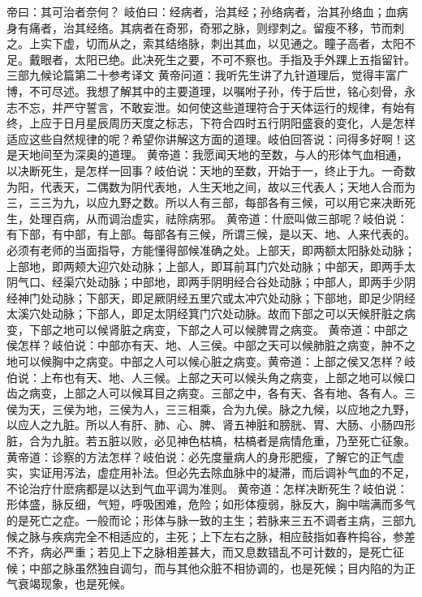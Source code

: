 \documentclass[a4paper,12pt,UTF8,twoside]{ctexbook}
\begin{document}
帝曰：其可治者奈何？
岐伯曰：经病者，治其经；孙络病者，治其孙络血；血病身有痛者，治其经络。其病者在奇邪，奇邪之脉，则缪刺之。留瘦不移，节而刺之。上实下虚，切而从之，索其结络脉，刺出其血，以见通之。瞳子高者，太阳不足。戴眼者，太阳已绝。此决死生之要，不可不察也。手指及手外踝上五指留针。
三部九候论篇第二十参考译文
黄帝问道：我听先生讲了九针道理后，觉得丰富广博，不可尽述。我想了解其中的主要道理，以嘱咐子孙，传于后世，铭心刻骨，永志不忘，并严守誓言，不敢妄泄。如何使这些道理符合于天体运行的规律，有始有终，上应于日月星辰周历天度之标志，下符合四时五行阴阳盛衰的变化，人是怎样适应这些自然规律的呢？希望你讲解这方面的道理。岐伯回答说：问得多好啊！这是天地间至为深奥的道理。
黄帝道：我愿闻天地的至数，与人的形体气血相通，以决断死生，是怎样一回事？岐伯说：天地的至数，开始于一，终止于九。一奇数为阳，代表天，二偶数为阴代表地，人生天地之间，故以三代表人；天地人合而为三，三三为九，以应九野之数。所以人有三部，每部各有三候，可以用它来决断死生，处理百病，从而调治虚实，祛除病邪。
黄帝道：什麽叫做三部呢？岐伯说：有下部，有中部，有上部。每部各有三候，所谓三候，是以天、地、人来代表的。必须有老师的当面指导，方能懂得部候准确之处。上部天，即两额太阳脉处动脉；上部地，即两颊大迎穴处动脉；上部人，即耳前耳门穴处动脉；中部天，即两手太阴气口、经渠穴处动脉；中部地，即两手阴明经合谷处动脉；中部人，即两手少阴经神门处动脉；下部天，即足厥阴经五里穴或太冲穴处动脉；下部地，即足少阴经太溪穴处动脉；下部人，即足太阴经箕门穴处动脉。故而下部之可以天候肝脏之病变，下部之地可以候肾脏之病变，下部之人可以候脾胃之病变。
黄帝道：中部之侯怎样？岐伯说：中部亦有天、地、人三侯。中部之天可以候肺脏之病变，肿不之地可以候胸中之病变。中部之人可以候心脏之病变。黄帝道：上部之侯又怎样？岐伯说：上布也有天、地、人三候。上部之天可以候头角之病变，上部之地可以候口齿之病变，上部之人可以候耳目之病变。三部之中，各有天、各有地、各有人。三侯为天，三侯为地，三侯为人，三三相乘，合为九侯。脉之九候，以应地之九野，以应人之九脏。所以人有肝、肺、心、脾、肾五神脏和膀胱、胃、大肠、小肠四形脏，合为九脏。若五脏以败，必见神色枯槁，枯槁者是病情危重，乃至死亡征象。
黄帝道：诊察的方法怎样？岐伯说：必先度量病人的身形肥瘦，了解它的正气虚实，实证用泻法，虚症用补法。但必先去除血脉中的凝滞，而后调补气血的不足，不论治疗什麽病都是以达到气血平调为准则。
黄帝道：怎样决断死生？岐伯说：形体盛，脉反细，气短，呼吸困难，危险；如形体瘦弱，脉反大，胸中喘满而多气的是死亡之症。一般而论；形体与脉一致的主生；若脉来三五不调者主病，三部九候之脉与疾病完全不相适应的，主死；上下左右之脉，相应鼓指如春杵捣谷，参差不齐，病必严重；若见上下之脉相差甚大，而又息数错乱不可计数的，是死亡征候；中部之脉虽然独自调匀，而与其他众脏不相协调的，也是死候；目内陷的为正气衰竭现象，也是死候。
\end{document}
